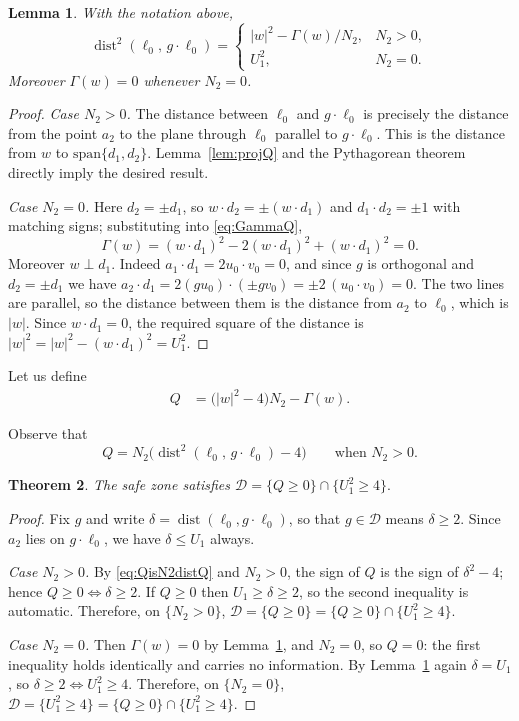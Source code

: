 \documentclass[reqno]{amsart}
\newtheorem{theorem}{Theorem}[section]
\newtheorem{lemma}[theorem]{Lemma}
\theoremstyle{definition}
\DeclareMathOperator{\dist}{dist}
\newcommand{\Dom}{\mathcal{D}}
\begin{document}
\begin{lemma}\label{lem:distQ}
With the notation above,
\[
\dist^{2}(\ell_0,\,g\cdot\ell_0)=
\begin{cases}
|w|^{2}-\Gamma(w)/N_2, & N_2>0,\\[2pt]
U_1^{2}, & N_2=0 .
\end{cases}
\]
Moreover $\Gamma(w)=0$ whenever $N_2=0$.
\end{lemma}
\begin{proof}
\emph{Case $N_2>0$.} The distance between $\ell_0$ and $g\cdot \ell_0$ is 
precisely the distance from the point $a_2$ to the plane through $\ell_0$ parallel to $g\cdot \ell_0$. This is the distance from $w$ to $\mathrm{span}\{d_1,d_2\}$. 
 Lemma~\ref{lem:projQ} and the Pythagorean theorem directly imply the desired result.

\emph{Case $N_2=0$.} Here $d_2=\pm d_1$, so $w\cdot d_2=\pm(w\cdot d_1)$ and
$d_1\cdot d_2=\pm1$ with matching signs; substituting into \eqref{eq:GammaQ},
\[
\Gamma(w)=(w\cdot d_1)^{2}-2(w\cdot d_1)^{2}+(w\cdot d_1)^{2}=0 .
\]
Moreover $w\perp d_1$. Indeed $a_1\cdot d_1=2u_0\cdot v_0=0$, and since $g$ is
orthogonal and $d_2=\pm d_1$ we have
$a_2\cdot d_1=2(gu_0)\cdot(\pm gv_0)=\pm2\,(u_0\cdot v_0)=0$. The two lines are
parallel, so the distance between them is the distance from $a_2$ to $\ell_0$,
which is $|w|$. Since $w\cdot d_1=0$, the required square of the distance is $|w|^{2}=|w|^{2}-(w\cdot d_1)^{2}=U_1^{2}$.
\end{proof}

Let us define
\begin{align}
Q&=\bigl(|w|^{2}-4\bigr)N_2-\Gamma(w). \label{eq:QQ}
\end{align} 

Observe that  
\begin{equation}\label{eq:QisN2distQ}
Q=N_2\bigl(\dist^{2}(\ell_0,\,g\cdot\ell_0)-4\bigr)\qquad\text{when }N_2>0 .
\end{equation}

\begin{theorem}\label{thm:domainQ}
The safe zone satisfies $\Dom=\{Q\ge0\}\cap\{U_1^{2}\ge4\}.$
\end{theorem}
\begin{proof}
Fix $g$ and write $\delta=\dist(\ell_0,g\cdot\ell_0)$, so that $g\in\Dom$ means $\delta\ge2$.
Since $a_2$ lies on $g\cdot\ell_0$, we have $\delta\le U_1$ always.

\emph{Case $N_2>0$.} By \eqref{eq:QisN2distQ} and $N_2>0$, the sign of $Q$ is the sign of
$\delta^{2}-4$; hence $Q\ge0\iff\delta\ge2$. If $Q\ge0$ then $U_1\ge\delta\ge2$, so the second
inequality is automatic. Therefore, on $\{N_2>0\}$,
$\Dom=\{Q\ge0\}=\{Q\ge0\}\cap\{U_1^{2}\ge4\}$.

\emph{Case $N_2=0$.} Then $\Gamma(w)=0$ by Lemma~\ref{lem:distQ}, and $N_2=0$, so $Q=0$: the first
inequality holds identically and carries no information. By Lemma~\ref{lem:distQ} again
$\delta=U_1$, so $\delta\ge2\iff U_1^{2}\ge4$. Therefore, on $\{N_2=0\}$,
$\Dom=\{U_1^{2}\ge4\}=\{Q\ge0\}\cap\{U_1^{2}\ge4\}$.
\end{proof}
\end{document}
